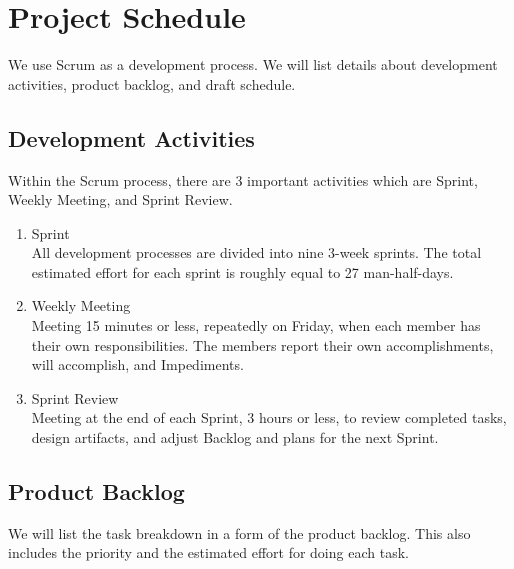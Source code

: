 \documentclass[12pt,oneside,openright,a4paper]{cpe-english-project}
\begin{document}
\section{Project Schedule}
We use Scrum as a development process. We will list details about development activities, product backlog, and draft schedule.

\subsection{Development Activities}
Within the Scrum process, there are 3 important activities which are Sprint, Weekly Meeting, and Sprint Review.

\begin{enumerate}
	\item Sprint \\
	All development processes are divided into nine 3-week sprints. The total estimated effort for each sprint is roughly equal to 27 man-half-days.
	\item Weekly Meeting \\
	Meeting 15 minutes or less, repeatedly on Friday, when each member has their own responsibilities. The members report their own accomplishments, will accomplish, and Impediments.
	\item Sprint Review \\
	Meeting at the end of each Sprint, 3 hours or less, to review completed tasks, design artifacts, and adjust Backlog and plans for the next Sprint.
\end{enumerate}

\subsection{Product Backlog}
We will list the task breakdown in a form of the product backlog. This also includes the priority and the estimated effort for doing each task.
\end{document}
